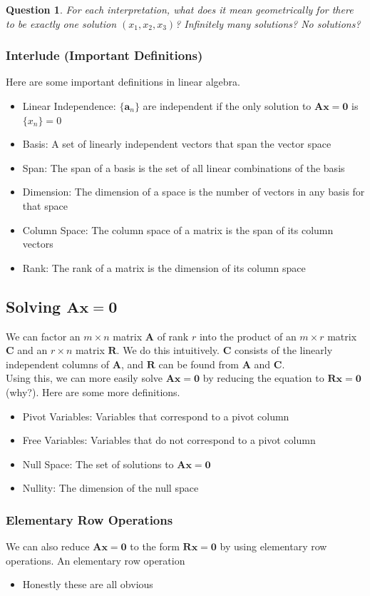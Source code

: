 \documentclass[11pt]{scrartcl}
\theoremstyle{plain}
\newtheorem*{question}{Question}
\theoremstyle{definition}
\theoremstyle{remark}
\begin{document}
\begin{question}
    For each interpretation, what does it mean geometrically for there to be exactly one solution 
    $(x_{1},x_{2},x_{3})$? Infinitely many solutions? No solutions?
\end{question}

\subsubsection{Interlude (Important Definitions)}

Here are some important definitions in linear algebra.

\begin{itemize}
    \item Linear Independence: $\{\mathbf{a}_{n}\}$ are independent if the only solution to $\mathbf{A}
    \mathbf{x}=\mathbf{0}$ is $\{x_{n}\}=0$
    \item Basis: A set of linearly independent vectors that span the vector space
    \item Span: The span of a basis is the set of all linear combinations of the basis %
    \item Dimension: The dimension of a space is the number of vectors in any basis for that space
    \item Column Space: The column space of a matrix is the span of its column vectors
    \item Rank: The rank of a matrix is the dimension of its column space
\end{itemize}

\subsection{Solving $\mathbf{A}\mathbf{x}=\mathbf{0}$}

We can factor an $m\times n$ matrix $\mathbf{A}$ of rank $r$ into the product of an $m\times r$ matrix $\mathbf{C}$ and an $r\times n$ matrix $\mathbf{R}$. We do this intuitively. $\mathbf{C}$ consists of the linearly independent columns of $\mathbf{A}$, and $\mathbf{R}$ can be found from $\mathbf{A}$ and $\mathbf{C}$. \\[-0.5em]

Using this, we can more easily solve $\mathbf{A}\mathbf{x}=\mathbf{0}$ by reducing the equation to $\mathbf{R}\mathbf{x}=\mathbf{0}$ (why?). Here are some more definitions.
\begin{itemize}
    \item Pivot Variables: Variables that correspond to a pivot column
    \item Free Variables: Variables that do not correspond to a pivot column
    \item Null Space: The set of solutions to $\mathbf{A}\mathbf{x}=\mathbf{0}$
    \item Nullity: The dimension of the null space
\end{itemize}

\subsubsection{Elementary Row Operations}
We can also reduce $\mathbf{A}\mathbf{x}=\mathbf{0}$ to the form $\mathbf{R}\mathbf{x}=\mathbf{0}$ by using elementary row operations. An elementary row operation 
\begin{itemize}
    \item Honestly these are all obvious
\end{itemize}
\end{document}
